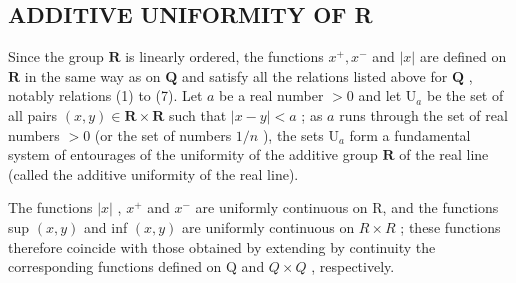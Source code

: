 \subsection{ADDITIVE UNIFORMITY OF R}

Since the group \(\mathbf{R}\) is linearly ordered, the functions \(x^{+}, x^{-}\) and \(|x|\) are defined on \(\mathbf{R}\) in the same way as on \(\mathbf{Q}\) and satisfy all the relations listed above for \(\mathbf{Q}\) , notably relations (1) to (7). Let \(a\) be a real number \(>0\) and let \(\mathrm{U}_{a}\) be the set of all pairs \((x, y) \in \mathbf{R} \times \mathbf{R}\) such that \(|x - y| < a\) ; as \(a\) runs through the set of real numbers \(>0\) (or the set of numbers \(1/n\) ), the sets \(\mathrm{U}_{a}\) form a fundamental system of entourages of the uniformity of the additive group \(\mathbf{R}\) of the real line (called the additive uniformity of the real line).

The functions \(|x|\) , \(x^{+}\) and \(x^{-}\) are uniformly continuous on R, and the functions sup \((x, y)\) and inf \((x, y)\) are uniformly continuous on \(R \times R\) ; these functions therefore coincide with those obtained by extending by continuity the corresponding functions defined on Q and \(Q \times Q\) , respectively.

